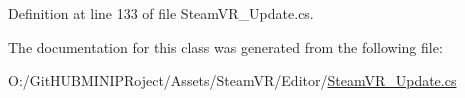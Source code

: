 Definition at line 133 of file Steam\+V\+R\+\_\+\+Update.\+cs.



The documentation for this class was generated from the following file\+:\begin{DoxyCompactItemize}
\item 
O\+:/\+Git\+H\+U\+B\+M\+I\+N\+I\+P\+Roject/\+Assets/\+Steam\+V\+R/\+Editor/\mbox{\hyperlink{_steam_v_r___update_8cs}{Steam\+V\+R\+\_\+\+Update.\+cs}}\end{DoxyCompactItemize}
